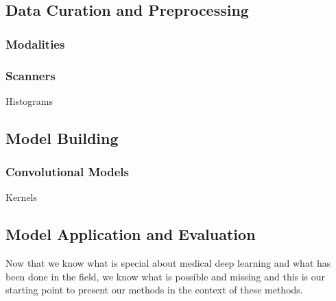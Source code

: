     \subsection{Data Curation and Preprocessing}
        \subsubsection{Modalities}
        \subsubsection{Scanners}
            Histograms
    \subsection{Model Building}
        \subsubsection{Convolutional Models}
            Kernels

    \subsection{Model Application and Evaluation}

    Now that we know what is special about medical deep learning and what has been done in the field, we know what is possible and missing and this is our starting point to present our methods in the context of these methods.